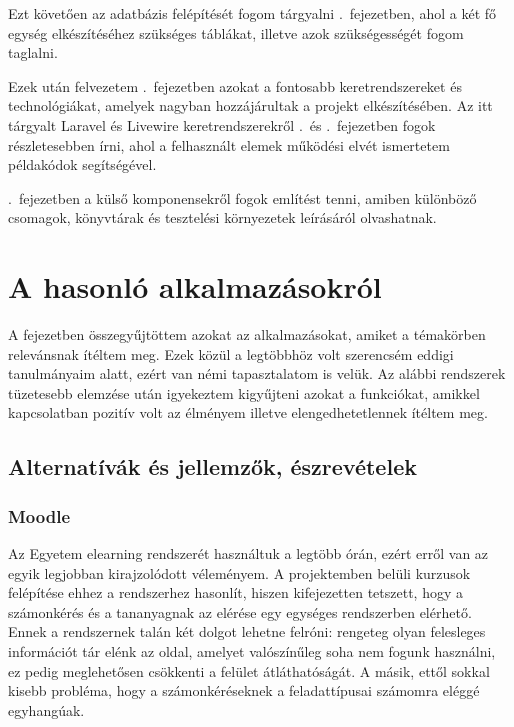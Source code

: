 \documentclass[
]{thesis-ekf}
\theoremstyle{definition}
\theoremstyle{remark}
\begin{document}
        Ezt követően az adatbázis felépítését fogom tárgyalni \az{\ref{Adatbazis}}.~fejezetben, ahol a két fő egység elkészítéséhez szükséges táblákat, illetve azok szükségességét fogom taglalni.

        Ezek után felvezetem \az{\ref{Technologiak-bemutat}}.~fejezetben azokat a fontosabb keretrendszereket és technológiákat, amelyek nagyban hozzájárultak a projekt elkészítésében. Az itt tárgyalt Laravel és Livewire keretrendszerekről \az{\ref{Laravel-mukodes}}.~és \az{\ref{Livewire}}.~fejezetben fogok részletesebben írni, ahol a felhasznált elemek működési elvét ismertetem példakódok segítségével.

        \Az{\ref{Kulso}}.~fejezetben a külső komponensekről fogok említést tenni, amiben különböző csomagok, könyvtárak és tesztelési környezetek leírásáról olvashatnak.
	
	\chapter{A hasonló alkalmazásokról}\label{kokurensek-label}
	A fejezetben összegyűjtöttem azokat az alkalmazásokat, amiket a témakörben relevánsnak ítéltem meg. Ezek közül a legtöbbhöz volt szerencsém eddigi tanulmányaim alatt, ezért van némi tapasztalatom is velük. Az alábbi rendszerek tüzetesebb elemzése után igyekeztem kigyűjteni azokat a funkciókat, amikkel kapcsolatban pozitív volt az élményem illetve elengedhetetlennek ítéltem meg.
	
	\section{Alternatívák és jellemzők, észrevételek}
	\subsection{Moodle}
	Az Egyetem elearning rendszerét\cite{Moodle} használtuk a legtöbb órán, ezért erről van az egyik legjobban kirajzolódott véleményem. A projektemben belüli kurzusok felépítése ehhez a rendszerhez hasonlít, hiszen kifejezetten tetszett, hogy a számonkérés és a tananyagnak az elérése egy egységes rendszerben elérhető. Ennek a rendszernek talán két dolgot lehetne felróni: rengeteg olyan felesleges információt tár elénk az oldal, amelyet valószínűleg soha nem fogunk használni, ez pedig meglehetősen csökkenti a felület átláthatóságát. A másik, ettől sokkal kisebb probléma, hogy a számonkéréseknek a feladattípusai számomra eléggé egyhangúak.
	
\end{document}
